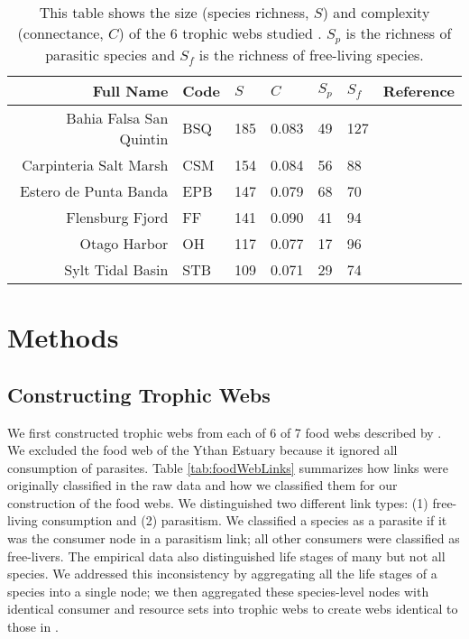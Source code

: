 \documentclass[/home/nkappler/Research/Dissertation/dissertation.tex]{subfiles}
\begin{document}
\begin{bibunit}
 \begin{table}
    \centering
    \begin{tabular}{r l l l l l l }
        \toprule
        Full Name               &Code       &$S$    &$C$    &$S_p$  &$S_f$  &Reference\\
        \midrule 
        Bahia Falsa San Quintin &BSQ        &185    &0.083  &49
                                &127&\cite*{Hechinger2011a}\\
        Carpinteria Salt Marsh  &CSM        &154    &0.084  &56     &88
                                &\cite*{Hechinger2011a}\\
        Estero de Punta Banda   &EPB        &147    &0.079  &68     &70
                                &\cite*{Hechinger2011a}\\
        Flensburg Fjord         &FF         &141    &0.090  &41     &94 &\cite*{Zander2011}\\
        Otago Harbor            &OH         &117    &0.077  &17     &96&\cite*{Mouritsen2011}\\
        Sylt Tidal Basin        &STB        &109    &0.071  &29     &74&\cite*{Thieltges2011}\\
        \bottomrule
    \end{tabular}
    \caption[Summary of empirical webs]{This table shows the size (species richness, $S$) and complexity
        (connectance, $C$) of the 6 trophic webs studied \cite*{Dunne2013}. $S_p$ is the richness of
    parasitic species and $S_f$ is the richness of free-living species.
    \label{tab:foodWebSummary}}
\end{table}


\section{Methods} 

\subsection{Constructing Trophic Webs} We first constructed trophic webs from
each of 6 of 7 food webs described by \cite*{Dunne2013}. We excluded the food
web of the Ythan Estuary because it ignored all consumption of parasites. Table
\ref{tab:foodWebLinks} summarizes how links were originally classified in the raw data and how we
classified them for our construction of the food webs. We distinguished two
different link types: (1) free-living consumption and (2) parasitism. We
classified a species as a parasite if it was the consumer node in a parasitism
link; all other consumers were classified as free-livers. The empirical data
also distinguished life stages of many but not all species. We addressed this
inconsistency by aggregating all the life stages of a species into a single
node; we then aggregated these species-level nodes with identical consumer and
resource sets into trophic webs to create webs identical to those in
\cite*{Dunne2013}. 


\end{bibunit}
\end{document}

